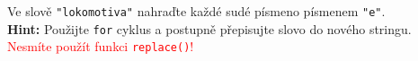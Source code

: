 \question[50]
Ve slově \texttt{"lokomotiva"} nahraďte každé sudé písmeno písmenem
\texttt{"e"}.\\
\textbf{Hint:} Použijte \texttt{for} cyklus a postupně přepisujte slovo do
nového stringu.\\
\textcolor{red}{Nesmíte použít funkci \texttt{replace()}!}